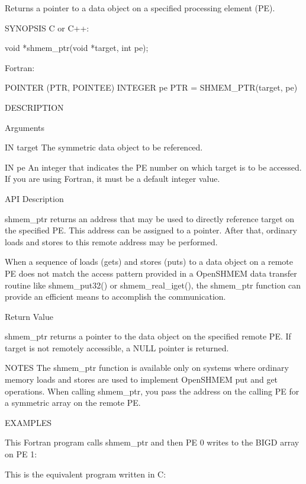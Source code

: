        Returns  a	 pointer  to  a	 data  object  on  a specified
       processing element (PE).

SYNOPSIS
       C or C++:

	  void *shmem_ptr(void *target, int pe);

       Fortran:

	  POINTER (PTR, POINTEE)
	  INTEGER pe
	  PTR = SHMEM_PTR(target, pe)

DESCRIPTION

Arguments

	IN       target	 The symmetric data object to be referenced.

       IN	pe	 An integer that indicates the PE number on which target is to
		 be accessed.  If you are using Fortran, it must be a  default
		 integer value.

API Description

       shmem_ptr returns an address that may be	 used  to  directly  reference
       target on the specified PE.  This address can be assigned to a pointer.
       After that, ordinary loads and stores to this  remote  address  may  be
       performed.

       When a sequence of loads (gets) and stores (puts) to a data object on a
       remote PE does not match the access pattern provided in	a OpenSHMEM data
       transfer	  routine   like  shmem_put32()  or  shmem_real_iget(),  the
       shmem_ptr function can provide an efficient  means  to  accomplish  the
       communication.

Return Value

       shmem_ptr returns a pointer to the data object on the specified	remote
       PE.   If target is not remotely accessible, a NULL pointer is returned.

NOTES
       The shmem_ptr function is available  only  on  systems  where  ordinary
       memory  loads  and  stores  are	used  to  implement OpenSHMEM put and get
       operations. When calling shmem_ptr, you pass the address on  the	calling	 PE  for  a  symmetric
       array on the remote PE.

EXAMPLES

       This  Fortran  program calls shmem_ptr and then PE 0 writes to the BIGD
       array on PE 1:

	

       This is the equivalent program written in C:

	

